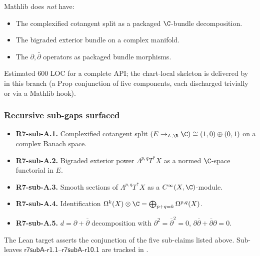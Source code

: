 Mathlib does \emph{not} have:
\begin{itemize}
\item The complexified cotangent split as a packaged
  \(\C\)-bundle decomposition.
\item The bigraded exterior bundle on a complex manifold.
\item The \(\partial,\bar\partial\) operators as packaged
  bundle morphisms.
\end{itemize}

Estimated 600 LOC for a complete API; the chart-local skeleton is
delivered by 
in this branch (a Prop conjunction of five components, each
discharged trivially or via a Mathlib hook).

\subsubsection*{Recursive sub-gaps surfaced}

\begin{itemize}
\item \textbf{R7-sub-A.1.}  Complexified cotangent split
  \((E\to_{L,\R}\C)\cong (1,0)\oplus(0,1)\) on a complex Banach space.
\item \textbf{R7-sub-A.2.}  Bigraded exterior power
  \(\Lambda^{p,q}T^{*}X\) as a normed \(\C\)-space functorial in
  \(E\).
\item \textbf{R7-sub-A.3.}  Smooth sections of \(\Lambda^{p,q}T^{*}X\)
  as a \(C^{\infty}(X,\C)\)-module.
\item \textbf{R7-sub-A.4.}  Identification
  \(\Omega^{k}(X)\otimes\C=\bigoplus_{p+q=k}\Omega^{p,q}(X)\).
\item \textbf{R7-sub-A.5.}  \(d=\partial+\bar\partial\) decomposition
  with \(\partial^{2}=\bar\partial^{2}=0\),
  \(\partial\bar\partial+\bar\partial\partial=0\).
\end{itemize}

\begin{theorem}
\label{input:bigraded-forms-complex}
The Lean target
asserts the conjunction of the five sub-claims listed above.
Sub-leaves \(\textsf{r7subA-r1.1}\)--\(\textsf{r7subA-r10.1}\) are
tracked in .
\leanok
\end{theorem}

